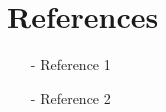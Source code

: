 \documentclass[reprint,english,notitlepage]{revtex4-1}  %
\begin{document}
\section*{References}  %
\begin{itemize}
\item[-]Reference 1
\item[-]Reference 2
\end{itemize}

\newpage
\appendix
\end{document}
